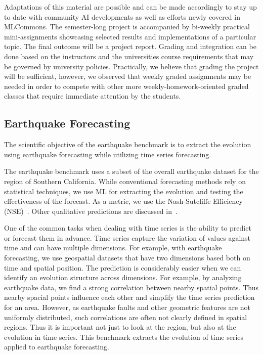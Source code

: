 \documentclass[utf8]{FrontiersinVancouver} %
\begin{document}
Adaptations of this material are possible and can be made accordingly to stay up to date with community AI developments as well as efforts newly covered in MLCommons. The semester-long project is accompanied by bi-weekly practical mini-assignments showcasing selected results and implementations of a particular topic. The final outcome will be a project report. Grading and integration can be done based on the instructors and the universities course requirements that may be governed by university policies. Practically, we believe that grading the project will be sufficient, however, we observed that weekly graded assignments may be needed in order to compete with other more weekly-homework-oriented graded classes that require immediate attention by the students.


\subsection{Earthquake Forecasting}
\label{sec:eq}

The scientific objective of the earthquake benchmark is to extract the evolution using earthquake forecasting while utilizing time series forecasting.

The earthquake benchmark uses a subset of the overall earthquake dataset for the region of Southern California. While conventional forecasting methods rely on statistical techniques, we use ML for extracting the evolution and testing the effectiveness of the forecast. As a metric, we use the Nash-Sutcliffe Efficiency (NSE)~\citep{nash-79}. Other qualitative predictions are discussed in~\citep{fox2022-jm}.

One of the common tasks when dealing with time series is the ability to predict or forecast them in advance. Time series capture the variation of values against time and can have multiple dimensions. For example, with earthquake forecasting, we use geospatial datasets that have two dimensions based both on time and spatial position. The prediction is considerably easier when we can identify an evolution structure across dimensions. For example, by analyzing earthquake data, we find a strong correlation between nearby spatial points. Thus nearby spacial points influence each other and simplify the time series prediction for an area. However, as earthquake faults and other geometric features are not uniformly distributed, such correlations are often not clearly defined in spatial regions. Thus it is important not just to look at the region, but also at the evolution in time series. This benchmark extracts the evolution of time series applied to earthquake forecasting.
\end{document}
